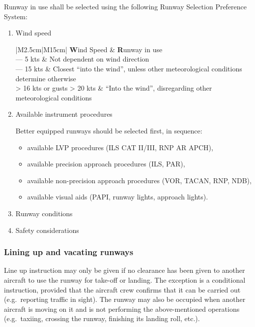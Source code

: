 Runway in use shall be selected using the following Runway Selection Preference System:
\begin{enumerate}
	\item Wind speed
	      \begin{table}[htb]
		      \centering
		      \begin{tabular}{|M{2.5cm}|M{15cm}|}
			      \color{white}\textbf Wind Speed & \color{white}\textbf Runway in use                                                    \\ --- 5 kts                     & Not dependent on wind direction                                                       \\ --- 15 kts                    & Closest ``into the wind'', unless other meteorological conditions determine otherwise \\\hline
			      > 16 kts or gusts > 20 kts      & ``Into the wind'', disregarding other meteorological conditions                       \\\hline
		      \end{tabular}
		      \caption{Runway Selection Preference System}\label{tbl:runwaySelect}
	      \end{table}
	\item Available instrument procedures

	      Better equipped runways should be selected first, in sequence:
	      \begin{itemize}
		      \item available LVP procedures (ILS CAT II/III, RNP AR APCH),
		      \item available precision approach procedures (ILS, PAR),
		      \item available non-precision approach procedures (VOR, TACAN, RNP, NDB),
		      \item available visual aids (PAPI, runway lights, approach lights).
	      \end{itemize}
	\item Runway conditions
	\item Safety considerations
\end{enumerate}

\subsubsection{Lining up and vacating runways}

Line up instruction may only be given if no clearance has been given to another aircraft to use the runway for take-off or landing. The exception is a conditional instruction, provided that the aircraft crew confirms that it can be carried out (e.g.\ reporting traffic in sight).
The runway may also be occupied when another aircraft is moving on it and is not performing the above-mentioned operations (e.g.\ taxiing, crossing the runway, finishing its landing roll, etc.).

